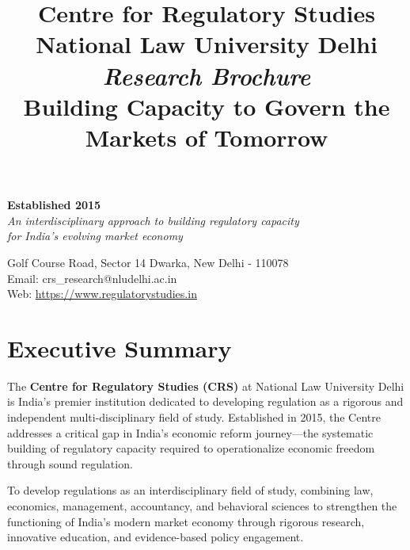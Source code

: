 \documentclass[11pt,a4paper]{article}
\title{
  \vspace{-2cm}
  \begin{center}
    {\headingfont\Huge\textcolor{oxblood}{Centre for Regulatory Studies}}\\[0.5cm]
    {\headingfont\Large National Law University Delhi}\\[1cm]
    {\Large\textit{Research Brochure}}\\[0.5cm]
    {\large Building Capacity to Govern the Markets of Tomorrow}
  \end{center}
}
\date{}
\author{}
\begin{document}
\maketitle
\thispagestyle{empty}

\vfill

\begin{center}
\begin{tcolorbox}[colback=vellum,colframe=goldthread,width=0.9\textwidth,arc=3mm]
\centering
\textbf{\headingfont Established 2015}\\[0.3cm]
\textit{An interdisciplinary approach to building regulatory capacity\\
for India's evolving market economy}
\end{tcolorbox}
\end{center}

\vfill

\begin{center}
\small
Golf Course Road, Sector 14 Dwarka, New Delhi - 110078\\
Email: crs\_research@nludelhi.ac.in\\
Web: \url{https://www.regulatorystudies.in}
\end{center}

\clearpage

\thispagestyle{fancy}

\section*{Executive Summary}

The \textbf{Centre for Regulatory Studies (CRS)} at National Law University Delhi is India's premier institution dedicated to developing regulation as a rigorous and independent multi-disciplinary field of study. Established in 2015, the Centre addresses a critical gap in India's economic reform journey—the systematic building of regulatory capacity required to operationalize economic freedom through sound regulation.

\vspace{0.5cm}

\begin{tcolorbox}[colback=ink!5,colframe=oxblood,title={\headingfont Our Mission},fonttitle=\bfseries\color{vellum},coltitle=vellum,colbacktitle=oxblood]
To develop regulations as an interdisciplinary field of study, combining law, economics, management, accountancy, and behavioral sciences to strengthen the functioning of India's modern market economy through rigorous research, innovative education, and evidence-based policy engagement.
\end{tcolorbox}
\end{document}
